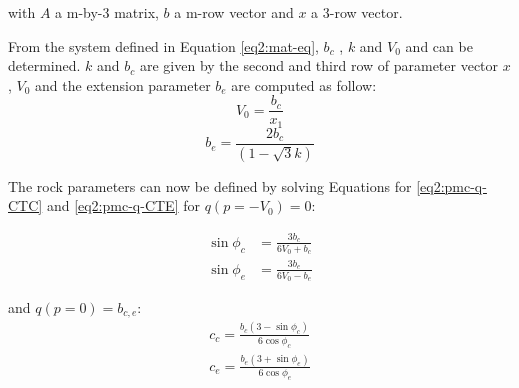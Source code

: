 with $A$ a m-by-3 matrix, $b$ a m-row vector and $x$  a 3-row vector. 

From the system defined in Equation \ref{eq2:mat-eq}, $b_c$ , $k$ and $V_0$  and can be determined. $k$ and $b_c$  are given by the second and third row of parameter vector $x$, $V_0$  and the extension parameter $b_e$ are computed as follow: 
\begin{equation}\label{eq2:pmc_vo}
    V_0 = \frac{b_c}{x_1}
\end{equation}
\begin{equation}\label{eq2:pmc_be}
    b_e = \frac{2b_c}{(1-\sqrt{3}k)} 
\end{equation}

The rock parameters can now be defined by solving Equations for \ref{eq2:pmc-q-CTC} and \ref{eq2:pmc-q-CTE} for $q(p=-V_0)=0$:

\begin{align}\label{eq2:pmc_phi}
    \sin \phi_c &= \frac{3b_c}{6V_0+b_c} \\
    \sin \phi_e &= \frac{3b_e}{6V_0-b_e} 
\end{align}

and $q(p=0)=b_{c,e}$:
\begin{align}\label{eq2:pmc_c}
    c_{c} =\frac{b_{c}\left(3-\sin \phi_{c}\right)}{6 \cos \phi_{c}} \\
    c_{e} =\frac{b_{e}\left(3+\sin \phi_{e}\right)}{6 \cos \phi_{e}}
\end{align}